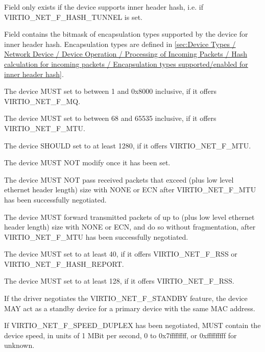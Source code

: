 Field  only exists if the device supports inner header hash, i.e. if VIRTIO_NET_F_HASH_TUNNEL is set.

Field  contains the bitmask of encapsulation types supported by the device for inner header hash.
Encapsulation types are defined in \ref{sec:Device Types / Network Device / Device Operation / Processing of Incoming Packets /
Hash calculation for incoming packets / Encapsulation types supported/enabled for inner header hash}.


The device MUST set  to between 1 and 0x8000 inclusive,
if it offers VIRTIO_NET_F_MQ.

The device MUST set  to between 68 and 65535 inclusive,
if it offers VIRTIO_NET_F_MTU.

The device SHOULD set  to at least 1280, if it offers
VIRTIO_NET_F_MTU.

The device MUST NOT modify  once it has been set.

The device MUST NOT pass received packets that exceed  (plus low
level ethernet header length) size with  NONE or ECN
after VIRTIO_NET_F_MTU has been successfully negotiated.

The device MUST forward transmitted packets of up to  (plus low
level ethernet header length) size with  NONE or ECN, and do
so without fragmentation, after VIRTIO_NET_F_MTU has been successfully
negotiated.

The device MUST set  to at least 40, if it offers
VIRTIO_NET_F_RSS or VIRTIO_NET_F_HASH_REPORT.

The device MUST set  to at least 128, if it offers
VIRTIO_NET_F_RSS.

If the driver negotiates the VIRTIO_NET_F_STANDBY feature, the device MAY act
as a standby device for a primary device with the same MAC address.

If VIRTIO_NET_F_SPEED_DUPLEX has been negotiated, 
MUST contain the device speed, in units of 1 MBit per second, 0 to
0x7ffffffff, or 0xfffffffff for unknown.

